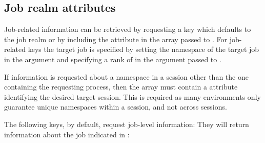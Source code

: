\subsection{Job realm attributes}
\label{chap:api_rsvd_keys:jrealm}

Job-related information can be retrieved by requesting a key which defaults
to the job realm or by including the  attribute
in the  array passed to .
For job-related keys the target job is specified by setting the namespace of the target
job in the  argument and specifying a rank of  
in the  argument passed to .


If information is requested about a namespace in
a session other than the one containing the requesting process, then the
 array must contain a  attribute
identifying the desired target session. This is required as
many environments only guarantee unique namespaces within a session, and not
across sessions.

The following keys, by default, request job-level information:
They will return information about the job indicated in :

